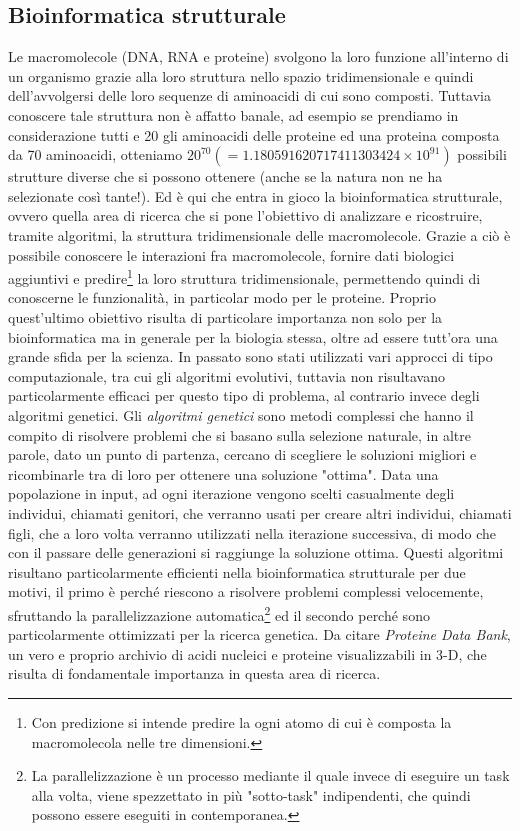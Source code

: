 \subsection{Bioinformatica strutturale}
Le macromolecole (DNA, RNA e proteine) svolgono la loro funzione all'interno di un organismo grazie alla loro struttura nello spazio tridimensionale e quindi dell'avvolgersi delle loro sequenze di aminoacidi di cui sono composti. Tuttavia conoscere tale struttura non è affatto banale, ad esempio se prendiamo in considerazione tutti e 20 gli aminoacidi delle proteine ed una proteina composta da 70 aminoacidi, otteniamo $20^{70}(=1.180591620717411303424\times{10^{91}})$ possibili strutture diverse che si possono ottenere (anche se la natura non ne ha selezionate  così tante!). Ed è qui che entra in gioco la bioinformatica strutturale, ovvero quella area di ricerca che si pone l'obiettivo di analizzare e ricostruire, tramite algoritmi, la struttura tridimensionale delle macromolecole.
\newline
Grazie a ciò è possibile conoscere le interazioni fra macromolecole, fornire dati biologici aggiuntivi e predire\footnote{Con predizione si intende predire la ogni atomo di cui è composta la macromolecola nelle tre dimensioni.} la loro struttura tridimensionale, permettendo quindi di conoscerne le funzionalità, in particolar modo per le proteine. Proprio quest'ultimo obiettivo risulta di particolare importanza non solo per la bioinformatica ma in generale per la biologia stessa, oltre ad essere tutt'ora una grande sfida per la scienza.
\newline
In passato sono stati utilizzati vari approcci di tipo computazionale, tra cui gli algoritmi evolutivi, tuttavia non risultavano particolarmente efficaci per questo tipo di problema, al contrario invece degli algoritmi genetici.
\newline
Gli \textit{algoritmi genetici} sono metodi complessi che hanno il compito di risolvere problemi che si basano sulla selezione naturale, in altre parole, dato un punto di partenza, cercano di scegliere le soluzioni migliori e ricombinarle tra di loro per ottenere una soluzione "ottima". Data una popolazione in input, ad ogni iterazione vengono scelti casualmente degli individui, chiamati genitori, che verranno usati per creare altri individui, chiamati figli, che a loro volta verranno utilizzati nella iterazione successiva, di modo che con il passare delle generazioni si raggiunge la soluzione ottima.
\newline
Questi algoritmi risultano particolarmente efficienti nella bioinformatica strutturale per due motivi, il primo è perché riescono a risolvere problemi complessi velocemente, sfruttando la parallelizzazione automatica\footnote{La parallelizzazione è un processo mediante il quale invece di eseguire un task alla volta, viene spezzettato in più "sotto-task" indipendenti, che quindi possono essere eseguiti in contemporanea.} ed il secondo perché sono particolarmente ottimizzati per la ricerca genetica.
\newline
Da citare \textit{Proteine Data Bank}\cite{proteineDataBank}, un vero e proprio archivio di acidi nucleici e proteine visualizzabili in 3-D, che risulta di fondamentale importanza in questa area di ricerca.

